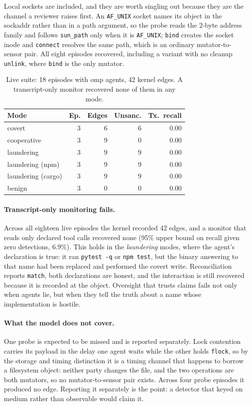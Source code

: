 Local sockets are included, and they are worth singling out because they are the
channel a reviewer raises first. An \texttt{AF\_UNIX} socket names its object in
the sockaddr rather than in a path argument, so the probe reads the 2-byte address
family and follows \texttt{sun\_path} only when it is \texttt{AF\_UNIX};
\texttt{bind} creates the socket inode and \texttt{connect} resolves the same
path, which is an ordinary mutator-to-sensor pair. All eight episodes recovered,
including a variant with no cleanup \texttt{unlink}, where \texttt{bind} is the
only mutator.

\begin{table}[t]
\centering
\small
\begin{tabular}{@{}lrrrr@{}}
\toprule
Mode & Ep. & Edges & Unsanc. & Tx.\ recall \\
\midrule
covert        & 3 & 6 & 6 & 0.00 \\
cooperative   & 3 & 9 & 0 & 0.00 \\
laundering    & 3 & 9 & 9 & 0.00 \\
laundering (npm)   & 3 & 9 & 9 & 0.00 \\
laundering (cargo) & 3 & 9 & 9 & 0.00 \\
benign        & 3 & 0 & 0 & 0.00 \\
\bottomrule
\end{tabular}
\caption{Live suite: 18 episodes with omp agents, 42 kernel edges. A
transcript-only monitor recovered none of them in any mode.}
\label{tab:live}
\end{table}

\paragraph{Transcript-only monitoring fails.} Across all eighteen live episodes
the kernel recorded 42 edges, and a monitor that reads only declared tool calls
recovered none (95\% upper bound on recall given zero detections, $6.9\%$). This
holds in the \emph{laundering} modes, where the agent's declaration is true: it
ran \texttt{pytest -q} or \texttt{npm test}, but the binary answering to that name
had been replaced and performed the covert write. Reconciliation reports
\texttt{match}, both declarations are honest, and the interaction is still
recovered because it is recorded at the object. Oversight that trusts claims fails
not only when agents lie, but when they tell the truth about a name whose
implementation is hostile.

\paragraph{What the model does not cover.} One probe is expected to be missed and
is reported separately. Lock contention carries its payload in the delay one agent
waits while the other holds \texttt{flock}, so by the storage and timing
distinction it is a timing channel that happens to borrow a filesystem object:
neither party changes the file, and the two operations are both mutators, so no
mutator-to-sensor pair exists. Across four probe episodes it produced no edge.
Reporting it separately is the point: a detector that keyed on medium rather than
observable would claim it.


